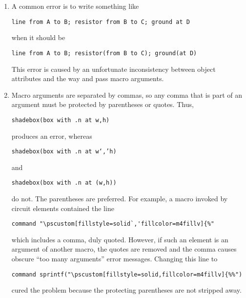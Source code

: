 \begin{enumerate}
{\tt there is no variable `rp\_ang'}

\noindent because {\tt rp\_ang} is not defined in the outermost scope of the
diagram.  To cure this problem, make sure that the line

{\tt cct\_init}

\noindent appears immediately after the .PS line or prior to the first block.
It is entirely permissible to modify {\tt cct\_init} to include customized
diagram initializations such as the {\tt thicklines\_} statement.
One way to do this is to define a macro {\tt local\_init} in
{\tt libgen.m4}.
\fi

\item
{}%
  A common error is to write something like

{\tt line from A to B; resistor from B to C; ground at D}

\noindent when it should be

{\tt line from A to B; resistor(from B to C); ground(at D)}

\noindent This error is caused by an unfortunate inconsistency between
\pic object attributes and the way \Mfour and \pic pass macro arguments.

\item 
{}
Macro arguments are separated by commas, so any comma that is
part of an argument must be protected by parentheses or quotes.  Thus,

{\tt shadebox(box with .n at w,h)}

\noindent produces an error, whereas

{\tt shadebox(box with .n at w`,'h)}

\noindent and

{\tt shadebox(box with .n at (w,h))}

\noindent do not. The parentheses are preferred.
For example,
a macro invoked by circuit elements contained the line

\verb|command "\pscustom[fillstyle=solid`,'fillcolor=m4fillv]{%"|

\noindent which includes a comma, duly quoted.  However, if such an
element is an argument of another macro, the quotes are removed and the
comma causes obscure ``too many arguments'' error messages.
Changing this line to

\verb|command sprintf("\pscustom[fillstyle=solid,fillcolor=m4fillv]{%%")|

\noindent
cured the problem because the protecting parentheses are not stripped away.


\end{enumerate}
